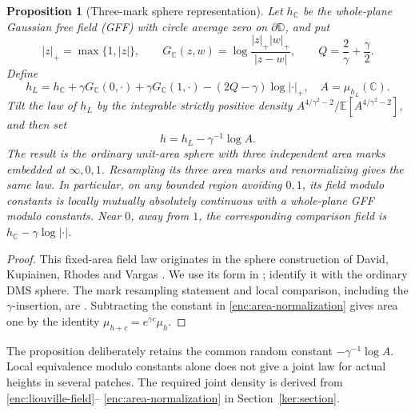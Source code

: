 \documentclass[11pt]{article}
\numberwithin{equation}{section}
\newtheorem{proposition}[theorem]{Proposition}
\theoremstyle{definition}
\theoremstyle{remark}
\newcommand{\1}{\mathbf 1}
\begin{document}
\begin{proposition}[Three-mark sphere representation]
\label{enc:sphere-representation}
Let $h_{\mathbb C}$ be the whole-plane Gaussian free field (GFF) with circle average zero on
$\partial\mathbb D$, and put
\[
 |z|_+=\max\{1,|z|\},\qquad
 G_{\mathbb C}(z,w)=\log\frac{|z|_+|w|_+}{|z-w|},\qquad
 Q=\frac2\gamma+\frac\gamma2.
\]
Define
\begin{equation}\label{enc:liouville-field}
 h_L=h_{\mathbb C}+\gamma G_{\mathbb C}(0,\cdot)+\gamma G_{\mathbb C}(1,\cdot)
       -(2Q-\gamma)\log|\cdot|_+,
 \quad A=\mu_{h_L}(\mathbb C).
\end{equation}
Tilt the law of $h_L$ by the integrable strictly positive density
$A^{4/\gamma^2-2}/\mathbb E[A^{4/\gamma^2-2}]$, and then set
\begin{equation}\label{enc:area-normalization}
 h=h_L-\gamma^{-1}\log A.
\end{equation}
The result is the ordinary unit-area sphere with three independent
area marks embedded at $\infty,0,1$.  Resampling its three area marks and
renormalizing gives the same law.  In particular, on any bounded region
avoiding $0,1$, its field modulo constants is locally mutually absolutely
continuous with a whole-plane GFF modulo constants.  Near $0$, away from
$1$, the corresponding comparison field is $h_{\mathbb C}-\gamma\log|\cdot|$.
\end{proposition}

\begin{proof}
This fixed-area field law originates in the sphere construction of
David, Kupiainen, Rhodes and Vargas
\citep[Section~3.3, Proposition~3.8 and Section~3.4]{DKRVSphere2016}.
We use its form in \citet[Definition~2.2]{BorgaGwynneSunPermutons};
\citet[Theorem~1.1 and Remark~1.2]{AruHuangSunSphere} identify it with
the ordinary DMS sphere.
The mark resampling statement and local comparison, including the
$\gamma$-insertion, are \cite[Lemmas 2.3--2.4]{BorgaGwynneSunPermutons}.
Subtracting the constant in \eqref{enc:area-normalization} gives area one
by the identity $\mu_{h+c}=e^{\gamma c}\mu_h$.
\end{proof}

The proposition deliberately retains the common random constant
$-\gamma^{-1}\log A$.  Local equivalence modulo constants alone does not
give a joint law for actual heights in several patches.  The required
joint density is derived from \eqref{enc:liouville-field}--
\eqref{enc:area-normalization} in Section~\ref{ker:section}.
\end{document}
